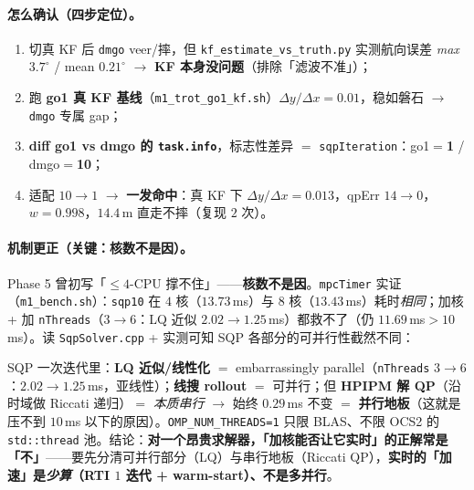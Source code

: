 \paragraph{怎么确认（四步定位）。}
\begin{enumerate}
  \item 切真 KF 后 \texttt{dmgo} veer/摔，但 \texttt{kf\_estimate\_vs\_truth.py} 实测航向误差 \emph{max} $3.7^\circ$ / mean $0.21^\circ$ $\to$ \textbf{KF 本身没问题}（排除「滤波不准」）；
  \item 跑 \textbf{go1 真 KF 基线}（\texttt{m1\_trot\_go1\_kf.sh}）$\Delta y/\Delta x{=}0.01$，稳如磐石 $\to$ \texttt{dmgo} 专属 gap；
  \item \textbf{diff go1 vs dmgo 的 \texttt{task.info}}，标志性差异 $=$ \texttt{sqpIteration}：go1$=$\textbf{1} / dmgo$=$\textbf{10}；
  \item 适配 $10\to1$ $\to$ \textbf{一发命中}：真 KF 下 $\Delta y/\Delta x{=}0.013$，qpErr $14\to0$，$w{=}0.998$，$14.4$\,m 直走不摔（复现 $2$ 次）。
\end{enumerate}

\paragraph{机制更正（关键：核数不是因）。}
Phase 5 曾初写「$\le4$-CPU 撑不住」——\textbf{核数不是因}。\texttt{mpcTimer} 实证（\texttt{m1\_bench.sh}）：\texttt{sqp10} 在 $4$ 核（$13.73$\,ms）与 $8$ 核（$13.43$\,ms）耗时\emph{相同}；加核 + 加 \texttt{nThreads}（$3\to6$：LQ 近似 $2.02\to1.25$\,ms）都救不了（仍 $11.69$\,ms$>10$\,ms）。读 \texttt{SqpSolver.cpp} + 实测可知 SQP 各部分的可并行性截然不同：

\begin{insight}\label{ins:qadv-parallel-floor}
SQP 一次迭代里：\textbf{LQ 近似/线性化} $=$ embarrassingly parallel（\texttt{nThreads} $3\to6$：$2.02\to1.25$\,ms，亚线性）；\textbf{线搜 rollout} $=$ 可并行；但 \textbf{HPIPM 解 QP}（沿时域做 Riccati 递归）$=$ \emph{本质串行} $\to$ 始终 $0.29$\,ms 不变 $=$ \textbf{并行地板}（这就是压不到 $10$\,ms 以下的原因）。\texttt{OMP\_NUM\_THREADS=1} 只限 BLAS、不限 OCS2 的 \texttt{std::thread} 池。结论：\textbf{对一个昂贵求解器，「加核能否让它实时」的正解常是「不」}——要先分清可并行部分（LQ）与串行地板（Riccati QP），\textbf{实时的「加速」是\emph{少算}（RTI $1$ 迭代 + warm-start）、不是多并行}\cite{frison2020hpipm}。
\end{insight}

